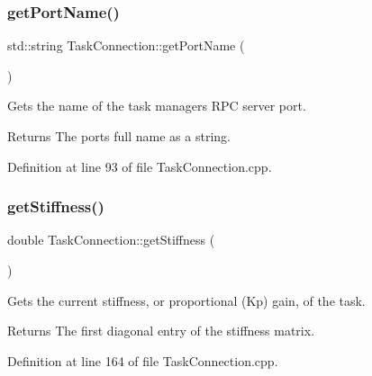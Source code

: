 \subsubsection{\texorpdfstring{get\+Port\+Name()}{getPortName()}}
{\footnotesize\ttfamily std\+::string Task\+Connection\+::get\+Port\+Name (\begin{DoxyParamCaption}{ }\end{DoxyParamCaption})}

Gets the name of the task manager\textquotesingle{}s R\+PC server port.

\begin{DoxyReturn}{Returns}
The port\textquotesingle{}s full name as a string. 
\end{DoxyReturn}


Definition at line 93 of file Task\+Connection.\+cpp.

\hypertarget{classocra__recipes_1_1TaskConnection_a88bda0e9df65e379e1b7f5b89929fdde}{}\label{classocra__recipes_1_1TaskConnection_a88bda0e9df65e379e1b7f5b89929fdde} 
\subsubsection{\texorpdfstring{get\+Stiffness()}{getStiffness()}}
{\footnotesize\ttfamily double Task\+Connection\+::get\+Stiffness (\begin{DoxyParamCaption}{ }\end{DoxyParamCaption})}

Gets the current stiffness, or proportional (Kp) gain, of the task.

\begin{DoxyReturn}{Returns}
The first diagonal entry of the stiffness matrix. 
\end{DoxyReturn}


Definition at line 164 of file Task\+Connection.\+cpp.

\hypertarget{classocra__recipes_1_1TaskConnection_abbcaa5c1769afc4e4074486fe4fb319a}{}\label{classocra__recipes_1_1TaskConnection_abbcaa5c1769afc4e4074486fe4fb319a} 
